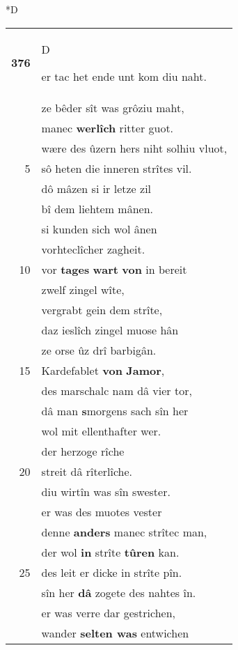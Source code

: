 \documentclass[8pt,a4paper,notitlepage]{article}
\begin{document}
\begin{table}[ht]
\begin{minipage}[t]{0.5\linewidth}
\small
\begin{center}*D
\end{center}
\begin{tabular}{rl}
\textbf{376} & \begin{large}D\end{large}er tac het ende unt kom diu naht.\\ 
 & ze bêder sît was grôziu maht,\\ 
 & manec \textbf{werlîch} ritter guot.\\ 
 & wære des ûzern hers niht solhiu vluot,\\ 
5 & sô heten die inneren strîtes vil.\\ 
 & dô mâzen si ir letze zil\\ 
 & bî dem liehtem mânen.\\ 
 & si kunden sich wol ânen\\ 
 & vorhteclîcher zagheit.\\ 
10 & vor \textbf{tages} \textbf{wart} \textbf{von} in bereit\\ 
 & zwelf zingel wîte,\\ 
 & vergrabt gein dem strîte,\\ 
 & daz ieslîch zingel muose hân\\ 
 & ze orse ûz drî barbigân.\\ 
15 & Kardefablet \textbf{von} \textbf{Jamor},\\ 
 & des marschalc nam dâ vier tor,\\ 
 & dâ man \textbf{s}morgens sach sîn her\\ 
 & wol mit ellenthafter wer.\\ 
 & der herzoge rîche\\ 
20 & streit dâ rîterlîche.\\ 
 & diu wirtîn was sîn swester.\\ 
 & er was des muotes vester\\ 
 & denne \textbf{anders} manec strîtec man,\\ 
 & der wol \textbf{in} strîte \textbf{tûren} kan.\\ 
25 & des leit er dicke in strîte pîn.\\ 
 & sîn her \textbf{dâ} zogete des nahtes în.\\ 
 & er was verre dar gestrichen,\\ 
 & wander \textbf{selten was} entwichen\\ 

\end{tabular}
\end{minipage}
\end{table}
\end{document}
